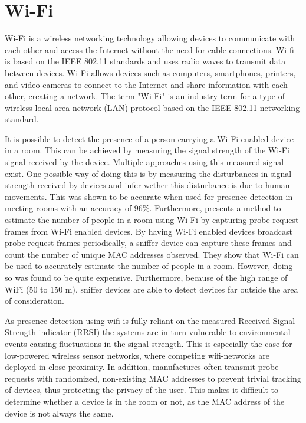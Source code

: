\section{Wi-Fi} \label{sec:wi-fi}
Wi-Fi is a wireless networking technology allowing devices to communicate with each other and access the Internet without the need for cable connections. 
Wi-fi is based on the IEEE 802.11\cite{iEEE80211} standards and uses radio waves to transmit data between devices.
Wi-Fi allows devices such as computers, smartphones, printers, and video cameras to connect to the Internet and share information with each other, creating a network.
The term "Wi-Fi" is an industry term for a type of wireless local area network (LAN) protocol based on the IEEE 802.11 networking standard.\cite{WiFiAllianceDiscover,CiscoWhatIsWiFi}

It is possible to detect the presence of a person carrying a Wi-Fi enabled device in a room.
This can be achieved by measuring the signal strength of the Wi-Fi signal received by the device.
Multiple approaches using this measured signal exist. 
One possible way of doing this is by measuring the disturbances in signal strength received by devices and infer wether this disturbance is due to human movements. 
This was shown to be accurate when used for presence detection in meeting rooms with an accuracy of 96\%. \cite{wifi_presence_detection_df}
Furthermore,\citeauthor{longoAccurateOccupancyEstimation2019}\cite{longoAccurateOccupancyEstimation2019} presents a method to estimate the number of people in a room using Wi-Fi by capturing probe request frames from Wi-Fi enabled devices.
By having Wi-Fi enabled devices broadcast probe request frames periodically, a sniffer device can capture these frames and count the number of unique MAC addresses observed.
They show that Wi-Fi can be used to accurately estimate the number of people in a room.
However, doing so was found to be quite expensive.
Furthermore, because of the high range of WiFi (50 to 150 m), sniffer devices are able to detect devices far outside the area of consideration.\cite{longoAccurateOccupancyEstimation2019}

As presence detection using wifi is fully reliant on the measured Received Signal Strength indicator (RRSI) the systems are in turn vulnerable to environmental events causing fluctuations in the signal strength.
This is especially the case for low-powered wireless sensor networks, where competing wifi-networks are deployed in close proximity.\cite{competing_wifi}
In addition, manufactures often transmit probe requests with randomized, non-existing MAC addresses to prevent trivial tracking of devices, thus protecting the privacy of the user.
This makes it difficult to determine whether a device is in the room or not, as the MAC address of the device is not always the same.\cite{longoAccurateOccupancyEstimation2019}